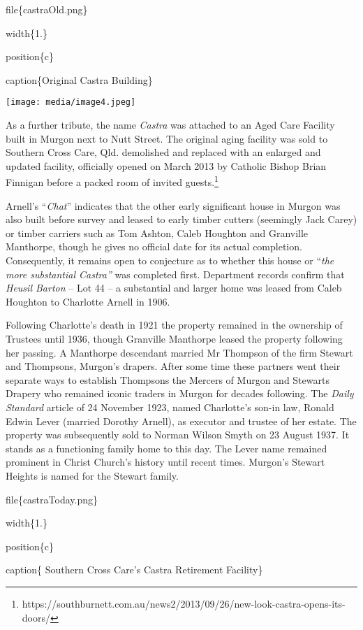 file\{castraOld.png\}

width\{1.\}

position\{c\}

caption\{Original Castra Building\}

\texttt{[image: media/image4.jpeg]}

As a further tribute, the name \emph{Castra} was attached to an Aged Care Facility built in Murgon next to Nutt Street. The original aging facility was sold to Southern Cross Care, Qld. demolished and replaced with an enlarged and updated facility, officially opened on March 2013 by Catholic Bishop Brian Finnigan before a packed room of invited guests.\footnote{https://southburnett.com.au/news2/2013/09/26/new-look-castra-opens-its-doors/}

Arnell's ``\emph{Chat}'' indicates that the other early significant house in Murgon was also built before survey and leased to early timber cutters (seemingly Jack Carey) or timber carriers such as Tom Ashton, Caleb Houghton and Granville Manthorpe, though he gives no official date for its actual completion. Consequently, it remains open to conjecture as to whether this house or ``\emph{the more substantial Castra''} was completed first. Department records confirm that \emph{Heusil Barton} -- Lot 44 -- a substantial and larger home was leased from Caleb Houghton to Charlotte Arnell in 1906.

Following Charlotte's death in 1921 the property remained in the ownership of Trustees until 1936, though Granville Manthorpe leased the property following her passing. A Manthorpe descendant married Mr Thompson of the firm Stewart and Thompsons, Murgon's drapers. After some time these partners went their separate ways to establish Thompsons the Mercers of Murgon and Stewarts Drapery who remained iconic traders in Murgon for decades following. The \emph{Daily Standard} article of 24 November 1923, named Charlotte's son-in law, Ronald Edwin Lever (married Dorothy Arnell), as executor and trustee of her estate. The property was subsequently sold to Norman Wilson Smyth on 23 August 1937. It stands as a functioning family home to this day. The Lever name remained prominent in Christ Church's history until recent times. Murgon's Stewart Heights is named for the Stewart family.

file\{castraToday.png\}

width\{1.\}

position\{c\}

caption\{ Southern Cross Care's Castra Retirement Facility\}

